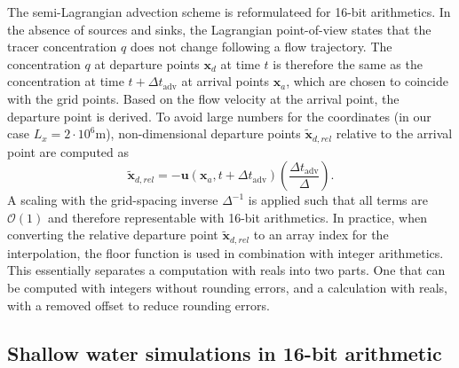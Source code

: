 \documentclass[draft]{agujournal2019}
\newcommand{\op}{\operatorname}
\begin{document}
The semi-Lagrangian advection scheme is reformulateed for 16-bit arithmetics.
In the absence of sources and sinks, the Lagrangian point-of-view states that
the tracer concentration $q$ does not change following a flow trajectory.
The concentration $q$ at departure points $\mathbf{x}_d$ at time $t$ is therefore
the same as the concentration at time $t+\Delta t_{\op{adv}}$ at arrival points
$\mathbf{x}_a$, which are chosen to coincide with the grid points.
Based on the flow velocity at the arrival point, the departure point is derived.
To avoid large numbers for the coordinates (in our case $L_x = 2 \cdot 10^6$m),
non-dimensional departure points $\mathbf{\tilde{x}}_{d,rel}$ relative to the
arrival point are computed as
\begin{equation}
\mathbf{\tilde{x}}_{d,rel} = - \mathbf{u}(\mathbf{x}_a,t+\Delta t_{\op{adv}})
\left( \frac{\Delta t_{\op{adv}}}{\Delta} \right).
\label{eq:relcoord}
\end{equation}
A scaling with the grid-spacing inverse $\Delta^{-1}$ is applied such that all
terms are $\mathcal{O}(1)$ and therefore representable with 16-bit arithmetics.
In practice, when converting the relative departure point $\mathbf{\tilde{x}}_{d,rel}$
to an array index for the interpolation, the floor function is used in combination
with integer arithmetics. This essentially separates a computation with reals
into two parts. One that can be computed with integers without rounding errors,
and a calculation with reals, with a removed offset to reduce rounding errors.

\subsection{Shallow water simulations in 16-bit arithmetic}
\end{document}
